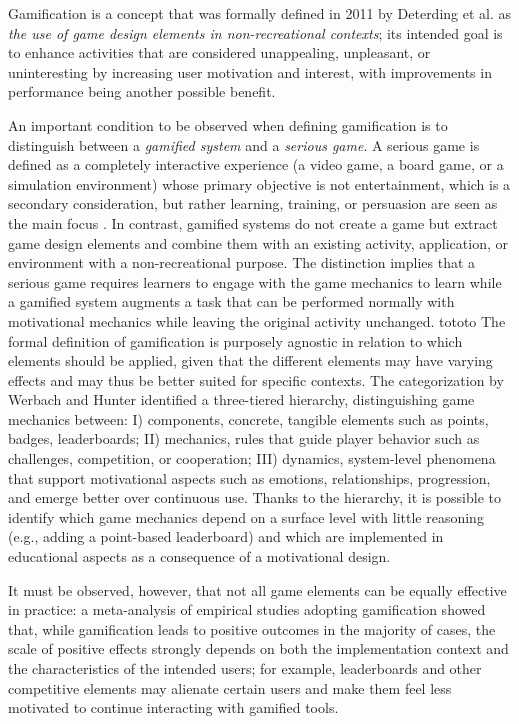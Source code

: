 Gamification is a concept that was formally defined in 2011 by Deterding et al. \cite{deterding_game_2011} as \emph{the use of game design elements in non-recreational contexts}; its intended goal is to enhance activities that are considered unappealing, unpleasant, or uninteresting by increasing user motivation and interest, with improvements in performance being another possible benefit.

An important condition to be observed when defining gamification is to distinguish between a \textit{gamified system} and a \textit{serious game}. A serious game is defined as a completely interactive experience (a video game, a board game, or a simulation environment) whose primary objective is not entertainment, which is a secondary consideration, but rather learning, training, or persuasion are seen as the main focus \cite{michael2006serious}. In contrast, gamified systems do not create a game but extract game design elements and combine them with an existing activity, application, or environment with a non-recreational purpose. The distinction implies that a serious game requires learners to engage with the game mechanics to learn while a gamified system augments a task that can be performed normally with motivational mechanics while leaving the original activity unchanged.
tototo
The formal definition of gamification is purposely agnostic in relation to which elements should be applied, given that the different elements may have varying effects and may thus be better suited for specific contexts. The categorization by Werbach and Hunter \cite{werbach2012win} identified a three-tiered hierarchy, distinguishing game mechanics between: I) components, concrete, tangible elements such as points, badges, leaderboards; II) mechanics, rules that guide player behavior such as challenges, competition, or cooperation; III) dynamics, system-level phenomena that support motivational aspects such as emotions, relationships, progression, and emerge better over continuous use. Thanks to the hierarchy, it is possible to identify which game mechanics depend on a surface level with little reasoning (e.g., adding a point-based leaderboard) and which are implemented in educational aspects as a consequence of a motivational design.

It must be observed, however, that not all game elements can be equally effective in practice: a meta-analysis of empirical studies adopting gamification \cite{hamari2014does} showed that, while gamification leads to positive outcomes in the majority of cases, the scale of positive effects strongly depends on both the implementation context and the characteristics of the intended users; for example, leaderboards and other competitive elements may alienate certain users and make them feel less motivated to continue interacting with gamified tools.

